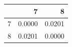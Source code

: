 \begin{tabular}{lrr}
\toprule
 & 7 & 8 \\
\midrule
7 & 0.0000 & 0.0201 \\
8 & 0.0201 & 0.0000 \\
\bottomrule
\end{tabular}

